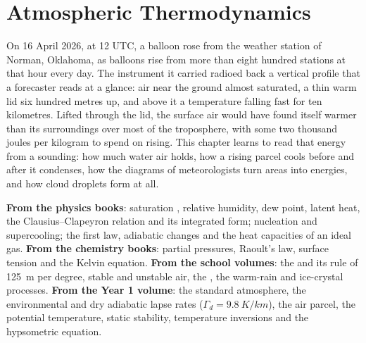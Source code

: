 \chapter{Atmospheric Thermodynamics}\label{ch:b2:atmospheric-thermodynamics}

On 16 April 2026, at 12 UTC, a balloon rose from the weather station of Norman, Oklahoma, as
balloons rise from more than eight hundred stations at that hour every day. The instrument it
carried radioed back a vertical profile that a forecaster reads at a glance: air near the ground
almost saturated, a thin warm lid six hundred metres up, and above it a temperature falling
fast for ten kilometres. Lifted through the lid, the surface air would have found itself
warmer than its surroundings over most of the troposphere, with some two thousand joules per
kilogram to spend on rising. This chapter learns to read that energy from a sounding: how much
water air holds, how a rising parcel cools before and after it condenses, how the diagrams of
meteorologists turn areas into energies, and how cloud droplets form at all.

\begin{recall}
\textbf{From the physics books}: saturation , relative humidity, dew point,
latent heat, the Clausius--Clapeyron relation and its integrated form; nucleation and
supercooling; the first law, adiabatic changes and the heat capacities of an ideal gas.
\textbf{From the chemistry books}: partial pressures, Raoult's law, surface tension and the Kelvin
equation. \textbf{From the school volumes}: the  and its rule of
\qty{125}{m} per degree, stable and unstable air, the , the warm-rain and
ice-crystal processes. \textbf{From the Year 1 volume}: the standard atmosphere, the environmental
and dry adiabatic lapse rates ($\Gamma_d = \qty{9.8}{K/km}$), the air parcel, the potential
temperature, static stability, temperature inversions and the hypsometric equation.
\end{recall}

